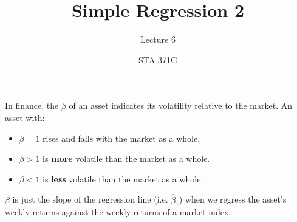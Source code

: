 \documentclass{beamer}\usepackage[]{graphicx}\usepackage[]{color}
\title{Simple Regression 2}
\subtitle{Lecture 6}
\author{STA 371G}
\makeatletter
\newcommand{\hlstr}[1]{\textcolor[rgb]{1,0.894,0.71}{#1}}%
\newcommand{\hlopt}[1]{\textcolor[rgb]{1,0.894,0.769}{#1}}%
\newcommand{\hlstd}[1]{\textcolor[rgb]{1,0.894,0.769}{#1}}%
\newcommand{\hlkwc}[1]{\textcolor[rgb]{0.78,0.941,0.545}{#1}}%
\newcommand{\hlkwd}[1]{\textcolor[rgb]{1,0.78,0.769}{#1}}%
\newenvironment{kframe}{%
 \def\at@end@of@kframe{}%
 \ifinner\ifhmode%
  \def\at@end@of@kframe{\end{minipage}}%
  \begin{minipage}{\columnwidth}%
 \fi\fi%
 \def\FrameCommand##1{\hskip\@totalleftmargin \hskip-\fboxsep
 \colorbox{shadecolor}{##1}\hskip-\fboxsep
     \hskip-\linewidth \hskip-\@totalleftmargin \hskip\columnwidth}%
 \MakeFramed {\advance\hsize-\width
   \@totalleftmargin\z@ \linewidth\hsize
   \@setminipage}}%
 {\par\unskip\endMakeFramed%
 \at@end@of@kframe}
\newenvironment{knitrout}{}{} %
\makeatother
\begin{document}
  
  
  

  \frame{\maketitle}



  \begin{darkframes}
    \begin{frame}
      In finance, the $\beta$ of an asset indicates its volatility relative to the market. An asset with:
      \pause
      \begin{itemize}[<+->]
        \item $\beta=1$ rises and falls with the market as a whole.
        \item $\beta>1$ is \textbf{more} volatile than the market as a whole.
        \item $\beta<1$ is \textbf{less} volatile than the market as a whole.
      \end{itemize}
      \pause
      $\beta$ is just the slope of the regression line (i.e. $\hat\beta_1$) when we regress the asset's weekly returns against the weekly returns of a market index. 
    \end{frame}



\end{darkframes}
\end{document}
